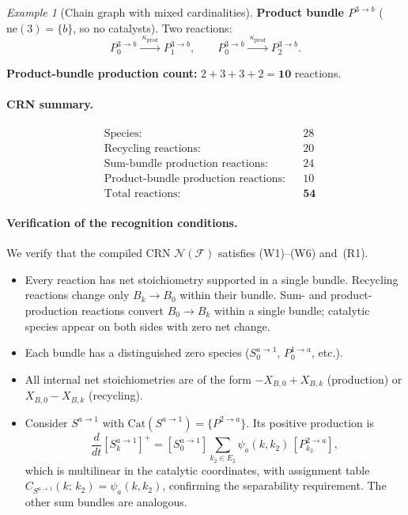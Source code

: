 \documentclass{article}
\theoremstyle{plain}
\theoremstyle{definition}
\theoremstyle{remark}
\newtheorem{example}{Example}[section]
\newcommand{\<}{\langle}
\renewcommand{\>}{\rangle}
\begin{document}
\begin{example}[Chain graph with mixed cardinalities]
\smallskip
\noindent\textbf{Product bundle $P^{3\to b}$}
($\mathrm{ne}(3)=\{b\}$, so no catalysts).
Two reactions:
\[
P^{3\to b}_0
\xrightarrow{\;\kappa_{\mathrm{prod}}\;}
P^{3\to b}_1,
\qquad
P^{3\to b}_0
\xrightarrow{\;\kappa_{\mathrm{prod}}\;}
P^{3\to b}_2.
\]
 
\noindent
\textbf{Product-bundle production count:} $2+3+3+2 = \mathbf{10}$ reactions.
 
 
\paragraph{CRN summary.}
\[
\boxed{
\begin{aligned}
&\text{Species:} & &28 \\
&\text{Recycling reactions:} & &20 \\
&\text{Sum-bundle production reactions:} & &24 \\
&\text{Product-bundle production reactions:} & &10 \\
&\text{Total reactions:} & &\mathbf{54}
\end{aligned}
}
\]
 
 
\paragraph{Verification of the recognition conditions.}
We verify that the compiled CRN $\mathcal{N}(\mathcal{F})$
satisfies (W1)--(W6) and~(R1).
 
\begin{itemize}
\item[(W1)] Every reaction has net stoichiometry supported in a single
  bundle.  Recycling reactions change only $B_k\to B_0$ within their
  bundle.  Sum- and product-production reactions convert $B_0\to B_k$
  within a single bundle; catalytic species appear on both sides with
  zero net change.
 
\item[(W2)] Each bundle has a distinguished zero species
  ($S^{a\to 1}_0$, $P^{1\to a}_0$, etc.).
 
\item[(W3)] All internal net stoichiometries are of the form
  $-X_{B,0}+X_{B,k}$ (production) or $X_{B,0}-X_{B,k}$ (recycling).
 
\item[(W4)] Consider $S^{a\to 1}$ with $\mathrm{Cat}(S^{a\to 1})=
  \{P^{2\to a}\}$.  Its positive production is
  \[
  \frac{d}{dt}[S^{a\to 1}_k]^+
  = [S^{a\to 1}_0]\sum_{k_2\in E_2}
    \psi_a(k, k_2)\,[P^{2\to a}_{k_2}],
  \]
  which is multilinear in the catalytic coordinates, with assignment
  table $C_{S^{a\to 1}}(k;\, k_2)=\psi_a(k,k_2)$, confirming the
  separability requirement.
  The other sum bundles are analogous.
 

\end{itemize}
\end{example}
\end{document}
